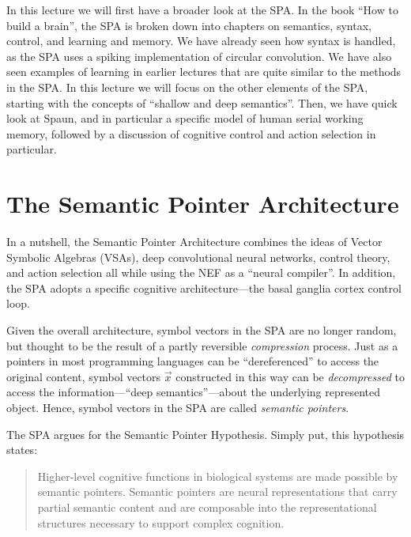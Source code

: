 \documentclass[10pt,letterpaper,oneside]{article}
\begin{document}
In this lecture we will first have a broader look at the SPA. In the book \enquote{How to build a brain}, the SPA is broken down into chapters on semantics, syntax, control, and learning and memory. We have already seen how syntax is handled, as the SPA uses a spiking implementation of circular convolution.  We have also seen examples of learning in earlier lectures that are quite similar to the methods in the SPA. In this lecture we will focus on the other elements of the SPA, starting with the concepts of \enquote{shallow and deep semantics}. Then, we have quick look at Spaun, and in particular a specific model of human serial working memory, followed by a discussion of cognitive control and action selection in particular.

\section{The Semantic Pointer Architecture}


In a nutshell, the Semantic Pointer Architecture combines the ideas of Vector Symbolic Algebras (VSAs), deep convolutional neural networks, control theory, and action selection all while using the NEF as a \enquote{neural compiler}. In addition, the SPA adopts a specific cognitive architecture---the basal ganglia cortex control loop.

Given the overall architecture, symbol vectors in the SPA are no longer random, but thought to be the result of a partly reversible \emph{compression} process. Just as a pointers in most programming languages can be \enquote{dereferenced} to access the original content, symbol vectors $\vec x$ constructed in this way can be \emph{decompressed} to access the information---\enquote{deep semantics}---about the underlying represented object. Hence, symbol vectors in the SPA are called \emph{semantic pointers}.

The SPA argues for the Semantic Pointer Hypothesis. Simply put, this hypothesis states: 
\begin{quote}
Higher-level cognitive functions in biological systems are made possible by semantic pointers. Semantic pointers are neural representations that carry partial semantic content and are composable into the representational structures necessary to support complex cognition.
\end{quote}
\end{document}
